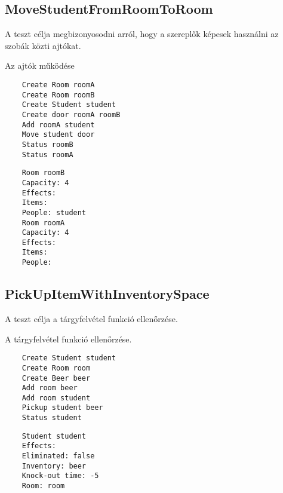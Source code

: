 \subsection{MoveStudentFromRoomToRoom}
\begin{test-case-description}
    A teszt célja megbizonyosodni arról, hogy a szereplők képesek használni az szobák közti ajtókat.
\end{test-case-description}
\begin{test-case-function}
    Az ajtók működése
\end{test-case-function}
\begin{test-case-input}
    \begin{verbatim}
    Create Room roomA
    Create Room roomB
    Create Student student
    Create door roomA roomB
    Add roomA student
    Move student door
    Status roomB
    Status roomA
    \end{verbatim}
\end{test-case-input}
\begin{test-case-output}
    \begin{verbatim}
    Room roomB
    Capacity: 4
    Effects:
    Items: 
    People: student
    Room roomA
    Capacity: 4
    Effects:
    Items: 
    People:
    \end{verbatim}
\end{test-case-output}

\subsection{PickUpItemWithInventorySpace}
\begin{test-case-description}
    A teszt célja a tárgyfelvétel funkció ellenőrzése.
\end{test-case-description}
\begin{test-case-function}
    A tárgyfelvétel funkció ellenőrzése.
\end{test-case-function}
\begin{test-case-input}
    \begin{verbatim}
    Create Student student
    Create Room room
    Create Beer beer
    Add room beer
    Add room student
    Pickup student beer
    Status student
    \end{verbatim}
\end{test-case-input}
\begin{test-case-output}
    \begin{verbatim}
    Student student
    Effects:
    Eliminated: false
    Inventory: beer
    Knock-out time: -5
    Room: room
    \end{verbatim}
\end{test-case-output}

